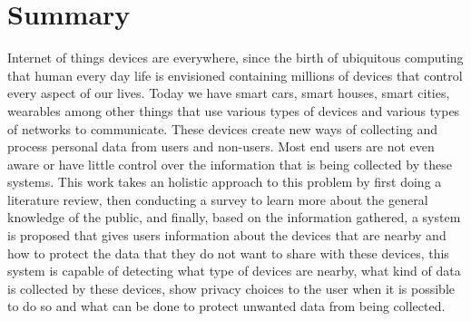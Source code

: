 %
%

\chapter*{Summary}
\justify

Internet of things devices are everywhere, since the birth of ubiquitous
computing that human every day life is envisioned containing millions of
devices that control every aspect of our lives. Today we have smart cars,
smart houses, smart cities, wearables among other things that use various
types of devices and various types of networks to communicate. These devices
create new ways of collecting and process personal data from users and
non-users. Most end users are not even aware or have little control over
the information that is being collected by these systems. This work takes
an holistic approach to this problem by first doing a literature review,
then conducting a survey to learn more about the general knowledge of the
public, and finally, based on the information gathered, a system is proposed
that gives users information about the devices that are nearby and how
to protect the data that they do not want to share with these devices, this
system is capable of detecting what type of devices are nearby, what kind
of data is collected by these devices, show privacy choices to the user
when it is possible to do so and what can be done to protect unwanted data
from being collected.

